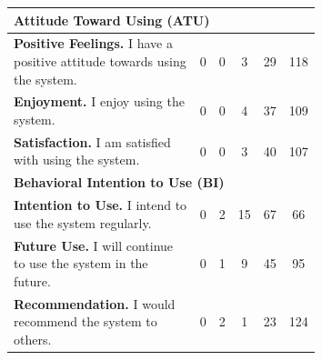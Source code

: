 \begin{longtable}{p{0.67\linewidth} c c c c c}
\multicolumn{6}{l}{\textbf{Attitude Toward Using (ATU)}} \\
\midrule
\textbf{Positive Feelings.} I have a positive attitude towards using the system. & 0 & 0 & 3 & 29 & 118 \\
\textbf{Enjoyment.} I enjoy using the system. & 0 & 0 & 4 & 37 & 109 \\
\textbf{Satisfaction.} I am satisfied with using the system. & 0 & 0 & 3 & 40 & 107 \\
\midrule

\multicolumn{6}{l}{\textbf{Behavioral Intention to Use (BI)}} \\
\midrule
\textbf{Intention to Use.} I intend to use the system regularly. & 0 & 2 & 15 & 67 & 66 \\
\textbf{Future Use.} I will continue to use the system in the future. & 0 & 1 & 9 & 45 & 95 \\
\textbf{Recommendation.} I would recommend the system to others. & 0 & 2 & 1 & 23 & 124 \\

\end{longtable}


